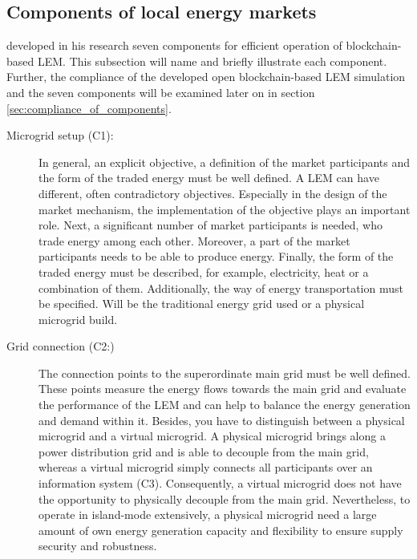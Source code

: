 \subsection{Components of local energy markets}
\label{sec:components_of_local_energy_markets}
 developed in his research seven components for efficient
operation of blockchain-based LEM. This subsection will name and briefly 
illustrate each component. Further, the compliance of the developed open blockchain-based
LEM simulation and the seven components will be examined later on in section \ref{sec:compliance_of_components}.

\begin{description}
    \item[Microgrid setup (C1):] In general, an explicit objective, a definition of the market 
     participants and the form of the traded energy must be well defined. 
     A LEM can have different, often contradictory objectives. Especially in the
     design of the market mechanism, the implementation of the objective plays an important role.
     Next, a significant number of market participants is needed, who trade energy among each other.
     Moreover, a part of the market participants needs to be able to produce energy. 
     Finally, the form of the traded energy must be described, for example, electricity, heat or a 
     combination of them. Additionally, the way of energy transportation must be specified.
     Will be the traditional energy grid used or a physical microgrid build. 
    
    \item[Grid connection (C2:)] The connection points to the superordinate main grid 
     must be well defined. These points measure the energy flows towards the main grid 
     and evaluate the performance of the LEM and can help to balance the energy generation 
     and demand within it. Besides, you have to distinguish between a physical microgrid and 
     a virtual microgrid. A physical microgrid brings along a power distribution grid and is able to
     decouple from the main grid, whereas a virtual microgrid simply connects all participants over 
     an information system (C3). Consequently, a virtual microgrid does not have the opportunity
     to physically decouple from the main grid. 
     Nevertheless, to operate in island-mode extensively, a physical microgrid need a large 
     amount of own energy generation capacity and flexibility to ensure supply security and robustness.
         

\end{description}
